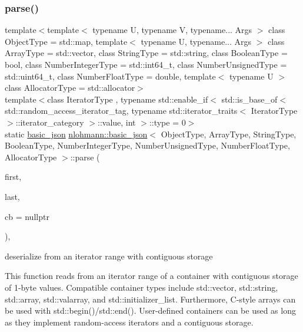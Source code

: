 \subsubsection{\texorpdfstring{parse()}{parse()}\hspace{0.1cm}{\footnotesize\ttfamily [5/6]}}
{\footnotesize\ttfamily template$<$template$<$ typename U, typename V, typename... Args $>$ class Object\+Type = std\+::map, template$<$ typename U, typename... Args $>$ class Array\+Type = std\+::vector, class String\+Type  = std\+::string, class Boolean\+Type  = bool, class Number\+Integer\+Type  = std\+::int64\+\_\+t, class Number\+Unsigned\+Type  = std\+::uint64\+\_\+t, class Number\+Float\+Type  = double, template$<$ typename U $>$ class Allocator\+Type = std\+::allocator$>$ \\
template$<$class Iterator\+Type , typename std\+::enable\+\_\+if$<$ std\+::is\+\_\+base\+\_\+of$<$ std\+::random\+\_\+access\+\_\+iterator\+\_\+tag, typename std\+::iterator\+\_\+traits$<$ Iterator\+Type $>$\+::iterator\+\_\+category $>$\+::value, int $>$\+::type  = 0$>$ \\
static \hyperlink{classnlohmann_1_1basic__json}{basic\+\_\+json} \hyperlink{classnlohmann_1_1basic__json}{nlohmann\+::basic\+\_\+json}$<$ Object\+Type, Array\+Type, String\+Type, Boolean\+Type, Number\+Integer\+Type, Number\+Unsigned\+Type, Number\+Float\+Type, Allocator\+Type $>$\+::parse (\begin{DoxyParamCaption}\item[{Iterator\+Type}]{first,  }\item[{Iterator\+Type}]{last,  }\item[{const \hyperlink{classnlohmann_1_1basic__json_a9e35475e2027520a78e09f460dbe048a}{parser\+\_\+callback\+\_\+t}}]{cb = {\ttfamily nullptr} }\end{DoxyParamCaption})\hspace{0.3cm}{\ttfamily [inline]}, {\ttfamily [static]}}



deserialize from an iterator range with contiguous storage 

This function reads from an iterator range of a container with contiguous storage of 1-\/byte values. Compatible container types include {\ttfamily std\+::vector}, {\ttfamily std\+::string}, {\ttfamily std\+::array}, {\ttfamily std\+::valarray}, and {\ttfamily std\+::initializer\+\_\+list}. Furthermore, C-\/style arrays can be used with {\ttfamily std\+::begin()}/{\ttfamily std\+::end()}. User-\/defined containers can be used as long as they implement random-\/access iterators and a contiguous storage.

